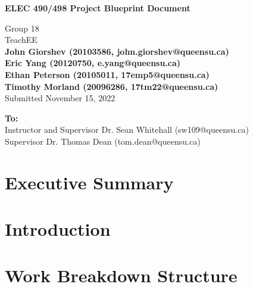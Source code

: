 \documentclass[letterpaper,12pt]{article}
\begin{document}
\begin{titlepage}
    \begin{center}
        \vspace*{1cm}

        \Large
        \textbf{ELEC 490/498 Project Blueprint Document}

        \vspace{0.5cm}
        Group 18\\
        TeachEE\\
        \vspace{0.5cm}
        \normalsize
        \textbf{John Giorshev (20103586, john.giorshev@queensu.ca) \\ Eric Yang (20120750, e.yang@queensu.ca) \\ Ethan Peterson (20105011, 17emp5@queensu.ca) \\ Timothy Morland (20096286, 17tm22@queensu.ca)}\\
        \vspace{0.5cm}
        Submitted November 15, 2022\\

        \vfill
            
        \textbf{To:}\\
        Instructor and Supervisor Dr. Sean Whitehall (sw109@queensu.ca) \\
        Supervisor Dr. Thomas Dean (tom.dean@queensu.ca) \\
            
        \vspace{1.8cm}

    \end{center}
\end{titlepage}
\section*{Executive Summary}

\newpage

\tableofcontents
\listoffigures
\listoftables
\newpage

\section{Introduction} \label{sec:intro} %

\section{Work Breakdown Structure} %
\end{document}
